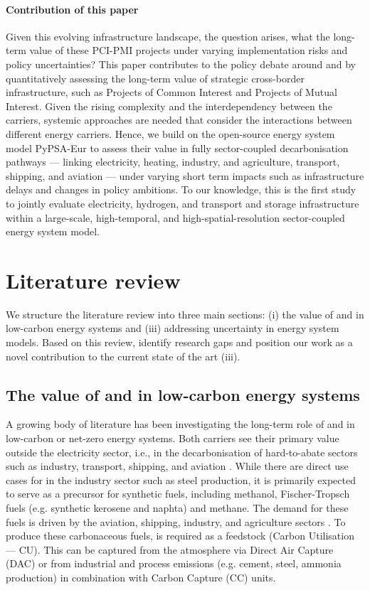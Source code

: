 \documentclass[preprint,12pt,sort&compress]{elsarticle}
\begin{document}
\paragraph{Contribution of this paper}
Given this evolving infrastructure landscape, the question arises, what the long-term value of these PCI-PMI projects under varying implementation risks and policy uncertainties?
This paper contributes to the policy debate around  and  by quantitatively assessing the long-term value of strategic cross-border infrastructure, such as Projects of Common Interest and Projects of Mutual Interest. Given the rising complexity and the interdependency between the carriers, systemic approaches are needed that consider the interactions between different energy carriers. Hence, we build on the open-source energy system model PyPSA-Eur to assess their value in fully sector-coupled decarbonisation pathways --- linking electricity, heating, industry, and agriculture, transport, shipping, and aviation --- under varying short term impacts such as infrastructure delays and changes in policy ambitions. To our knowledge, this is the first study to jointly evaluate electricity, hydrogen, and  transport and storage infrastructure within a large-scale, high-temporal, and high-spatial-resolution sector-coupled energy system model.

\section{Literature review}
\label{sec:literature_review}
We structure the literature review into three main sections: (i) the value of  and  in low-carbon energy systems and (iii) addressing uncertainty in energy system models. Based on this review, identify research gaps and position our work as a novel contribution to the current state of the art (iii).

\subsection{The value of  and  in low-carbon energy systems} 
A growing body of literature has been investigating the long-term role of  and  in low-carbon or net-zero energy systems. Both carriers see their primary value outside the electricity sector, i.e., in the decarbonisation of hard-to-abate sectors such as industry, transport, shipping, and aviation \cite{reigstadMovingLowcarbonHydrogen2022}. While there are direct use cases for  in the industry sector such as steel production, it is primarily expected to serve as a precursor for synthetic fuels, including methanol, Fischer-Tropsch fuels (e.g. synthetic kerosene and naphta) and methane. The demand for these fuels is driven by the aviation, shipping, industry, and agriculture sectors \cite{neumannPotentialRoleHydrogen2023}. To produce these carbonaceous fuels,  is required as a feedstock (Carbon Utilisation --- CU). This  can be captured from the atmosphere via Direct Air Capture (DAC) or from industrial and process emissions (e.g. cement, steel, ammonia production) in combination with Carbon Capture (CC) units.
\end{document}
